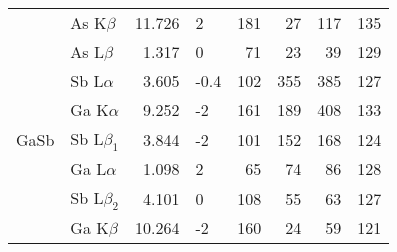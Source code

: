\begin{table}[phtb]
\begin{center}
\begin{tabular}{llrlrrrp{2.5cm}}
                              & As K$\beta$   & 11.726          & 2                   & 181           & 27                & 117                & 135                                   \\
                              & As L$\beta$   & 1.317           & 0                   & 71            & 23                & 39                 & 129                                   \\
            \hline
                              & Sb L$\alpha$  & 3.605           & -0.4                & 102           & 355               & 385                & 127                                   \\
                              & Ga K$\alpha$  & 9.252           & -2                  & 161           & 189               & 408                & 133                                   \\
            GaSb              & Sb L$\beta_1$  & 3.844           & -2                  & 101           & 152               & 168                & 124                                   \\
                              & Ga L$\alpha$  & 1.098           & 2                   & 65            & 74                & 86                 & 128                                   \\
                              & Sb L$\beta_2$  & 4.101           & 0                   & 108           & 55                & 63                 & 127                                   \\
                              & Ga K$\beta$   & 10.264          & -2                  & 160           & 24                & 59                 & 121                                   \\
            \hline
        \end{tabular}
    \end{center}
\end{table}
